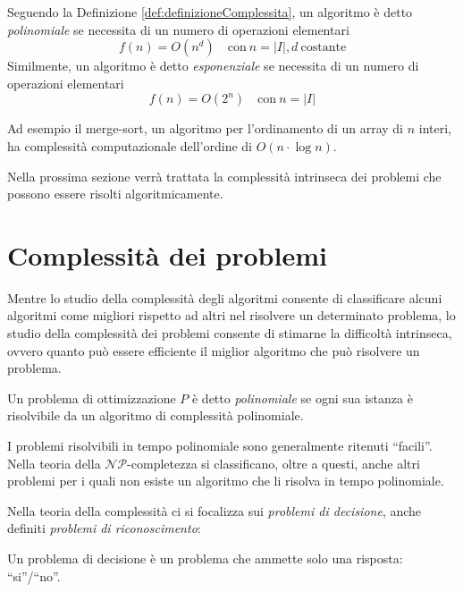 Seguendo la Definizione \ref{def:definizioneComplessita}, un algoritmo è detto 
\emph{polinomiale} se necessita di un numero di operazioni elementari
\begin{displaymath}
 f(n) = O(n^d) \quad \text{con}\  n = \vert I \vert, d\  \text{costante}
\end{displaymath}
Similmente, un algoritmo è detto \emph{esponenziale} se necessita di un numero di 
operazioni elementari
\begin{displaymath}
 f(n) = O(2^n) \quad \text{con}\ n = \vert I \vert
\end{displaymath}

Ad esempio il merge-sort, un algoritmo per l'ordinamento di un array di $n$ interi, ha 
complessità computazionale dell'ordine di $O(n\cdot \log n)$.

Nella prossima sezione verrà trattata la complessità intrinseca dei problemi che possono 
essere risolti algoritmicamente.

\section{Complessità dei problemi}
\label{sec:complessitaProblemi}
Mentre lo studio della complessità degli algoritmi consente di classificare alcuni 
algoritmi come migliori rispetto ad altri nel risolvere un determinato problema, lo 
studio della complessità dei problemi consente di stimarne la difficoltà intrinseca, 
ovvero quanto può essere efficiente il miglior algoritmo che può risolvere un problema.

\begin{mydef}
 Un problema di ottimizzazione $P$ è detto \emph{polinomiale} se ogni sua istanza è 
risolvibile da un algoritmo di complessità polinomiale.
\end{mydef}
I problemi risolvibili in tempo polinomiale sono generalmente ritenuti ``facili''. Nella 
teoria della $\mathcal{NP}$-completezza si classificano, oltre a questi, anche altri 
problemi per i quali non esiste un algoritmo che li risolva in tempo polinomiale.


Nella teoria della complessità ci si focalizza sui \emph{problemi di decisione}, anche 
definiti \emph{problemi di riconoscimento}:
\begin{mydef}
 Un problema di decisione è un problema che ammette solo una risposta: ``si''/``no''.
\end{mydef}

